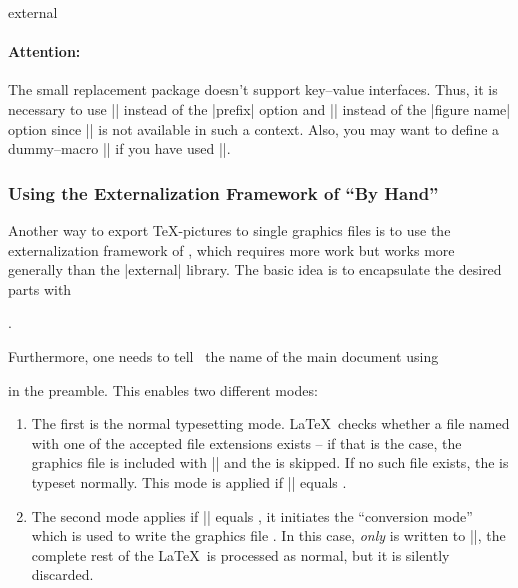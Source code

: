 {\begin{pgfplotslibrary}{external}
\paragraph{Attention:} The small replacement package doesn't support key--value interfaces. Thus, it is necessary to use || instead of the |prefix| option and || instead of the |figure name| option since |\tikzset| is not available in such a context. Also, you may want to define a dummy--macro |\pgfplotsset| if you have used |\pgfplotsset|.
\end{pgfplotslibrary}

\subsubsection[Using the Externalization Framework of PGF By Hand]{Using the Externalization Framework of {\normalfont\pgfname} ``By Hand''}
Another way to export \TeX-pictures to single graphics files is to use the externalization framework of \pgfname, which requires more work but works more generally than the |external| library.
The basic idea is to encapsulate the desired parts with

\declareandlabel{\beginpgfgraphicnamed}


\declareandlabel{\endpgfgraphicnamed}. 

\noindent Furthermore, one needs to tell \pgfname\ the name of the main document using

\declareandlabel{\pgfrealjobname}

\noindent in the preamble. This enables two different modes: 
\begin{enumerate}
	\item The first is the normal typesetting mode. \LaTeX\ checks whether a file named  with one of the accepted file extensions exists -- if that is the case, the graphics file is included with |\pgfimage| and the  is skipped. If no such file exists, the  is typeset normally. This mode is applied if |\jobname| equals .
	\item The second mode applies if |\jobname| equals , it initiates the ``conversion mode'' which is used to write the graphics file . In this case, \emph{only}  is written to |\jobname|, the complete rest of the \LaTeX\ is processed as normal, but it is silently discarded.


\end{enumerate}}
